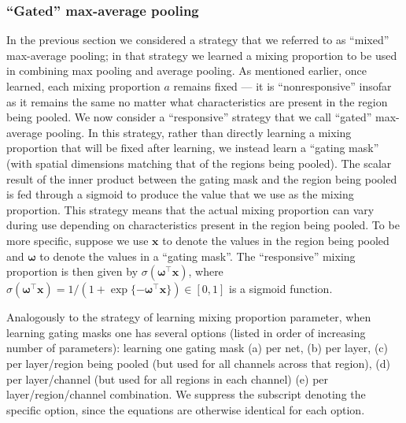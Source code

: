 \documentclass[twoside]{article}
\begin{document}
\subsubsection{``Gated'' max-average pooling}
\vspace{-2mm}
In the previous section we considered a strategy that we referred to as 
``mixed'' max-average pooling; in that strategy we learned a mixing proportion to 
be used in combining max pooling and average pooling. As mentioned earlier, once
learned, each mixing proportion $a$ remains fixed --- it is ``nonresponsive'' insofar 
as it remains the same no matter what characteristics are present in the region 
being pooled. We now consider a ``responsive'' strategy that we call ``gated'' max-average
pooling. In this strategy, rather than directly learning a mixing proportion that will be 
fixed after learning, we instead learn a ``gating mask'' (with spatial dimensions matching 
that of the regions being pooled). The scalar result of the inner product between 
the gating mask and the region being pooled is fed through a sigmoid to produce 
the value that we use as the mixing proportion.  This strategy means that the actual 
mixing proportion can vary during use depending on characteristics present in the 
region being pooled. To be more specific, suppose we use $\mathbf{x}$ to denote 
the values in the region being pooled and $\boldsymbol{\omega}$ to denote the values 
in a ``gating mask''. The ``responsive'' mixing proportion is then given by
$\sigma (\boldsymbol{\omega}^\intercal \mathbf{x})$, where
$\sigma(\boldsymbol{\omega}^\intercal \mathbf{x}) = 1/(1+\exp\{ -\boldsymbol{\omega}^\intercal \mathbf{x} \} ) \in [0, 1]$ 
is a sigmoid function. 

Analogously to the strategy of learning mixing proportion parameter, when learning 
gating masks one has several options (listed in order of increasing number of parameters):
learning one gating mask (a) per net, (b) per layer, (c) per layer/region being pooled 
(but used for all channels across that region), (d) per layer/channel (but used for all 
regions in each channel) (e) per layer/region/channel combination. We suppress the 
subscript denoting the specific option, since the equations are otherwise identical for each option.
\end{document}
